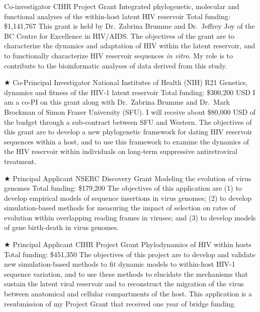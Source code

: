 \documentclass[11pt]{moderncv}
\begin{document}
{Co-investigator}
{CIHR Project Grant}  %
{Integrated phylogenetic, molecular and functional analyses of the within-host latent HIV reservoir}
{Total funding: \$1,141,767}
{
This grant is held by Dr.~Zabrina Brumme and Dr.~Jeffrey Joy of the BC Centre for Excellence in HIV/AIDS.
The objectives of the grant are to characterize the dynamics and adaptation of HIV within the latent reservoir, and to functionally characterize HIV reservoir sequences \textit{in vitro}.
My role is to contribute to the bioinformatic analyses of data derived from this study.
}

{$\bigstar$ Co-Principal Investigator}
{National Institutes of Health (NIH) R21}  %
{Genetics, dynamics and fitness of the HIV-1 latent reservoir}
{Total funding: \$300,200 USD}
{
I am a co-PI on this grant along with Dr.~Zabrina Brumme and Dr.~Mark Brockman of Simon Fraser University (SFU).
I will receive about \$80,000 USD of the budget through a sub-contract between SFU and Western.
The objectives of this grant are to develop a new phylogenetic framework for dating HIV reservoir sequences within a host, and to use this framework to examine the dynamics of the HIV reservoir within individuals on long-term suppressive antiretroviral treatment.
}

{$\bigstar$ Principal Applicant}
{NSERC Discovery Grant}
{Modeling the evolution of virus genomes}
{Total funding: \$179,200} %
{
The objectives of this application are (1) to develop empirical models of sequence insertions in virus genomes; (2) to develop simulation-based methods for measuring the impact of selection on rates of evolution within overlapping reading frames in viruses; and (3) to develop models of gene birth-death in virus genomes.\\
}



{$\bigstar$ Principal Applicant}
{CIHR Project Grant} %
{Phylodynamics of HIV within hosts}
{Total funding: \$451,350}
{
The objectives of this project are to develop and validate new simulation-based methods to fit dynamic models to within-host HIV-1 sequence variation, and to use these methods to elucidate the mechanisms that sustain the latent viral reservoir and to reconstruct the migration of the virus between anatomical and cellular compartments of the host.
This application is a resubmission of my Project Grant that received one year of bridge funding.\\ 
}
\end{document}
